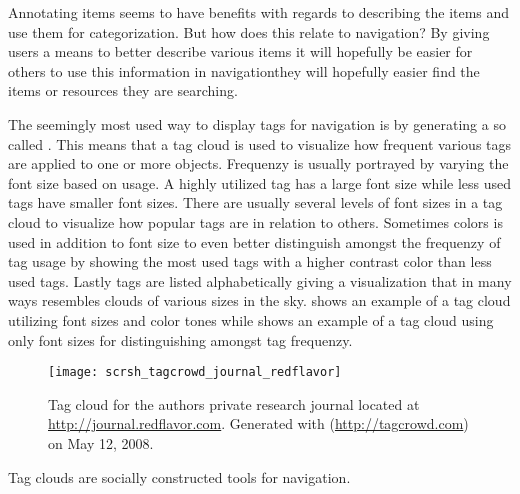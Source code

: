 Annotating items seems to have benefits with regards to describing the items
and use them for categorization. But how does this relate to navigation?
By giving users a means to better describe various items it will hopefully be
easier for others to use this information in navigation\dash{}they will
hopefully easier find the items or resources they are searching.

The seemingly most used way to display tags for navigation is by generating
a so called %
.
This means that a tag cloud is used to visualize how frequent various tags
are applied to one or more objects. Frequenzy is usually portrayed by varying
the font size based on usage. A highly utilized tag has a large font size
while less used tags have smaller font sizes. There are usually several levels
of font sizes in a tag cloud to visualize how popular tags are in relation to
others. Sometimes colors is used in addition to font size to even better
distinguish amongst the frequenzy of tag usage by showing the most used tags
with a higher contrast color than less used tags. Lastly tags are listed
alphabetically giving a visualization that in many ways resembles clouds of
various sizes in the sky.
shows an example of a tag cloud utilizing font sizes and color tones while
 shows an example of a tag cloud using
only font sizes for distinguishing amongst tag frequenzy.

\begin{figure}
  \centering
  \texttt{[image: scrsh\_tagcrowd\_journal\_redflavor]}
  \caption[Research Journal Tag Cloud]{
    Tag cloud for the authors private research journal located
    at \url{http://journal.redflavor.com}. Generated with
     (\url{http://tagcrowd.com}) on May 12, 2008.
  }
  \label{figure:scrsh.tagcrowd.journal.redflavor}
\end{figure}

Tag clouds are socially constructed tools for navigation. 


